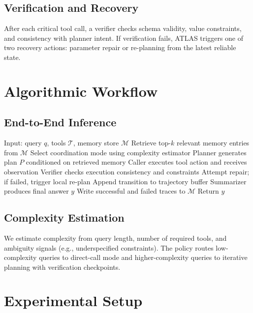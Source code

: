 \documentclass[conference]{IEEEtran}
\begin{document}
\subsection{Verification and Recovery}

After each critical tool call, a verifier checks schema validity, value constraints, and consistency with planner intent. If verification fails, ATLAS triggers one of two recovery actions: parameter repair or re-planning from the latest reliable state.

\section{Algorithmic Workflow}

\subsection{End-to-End Inference}

\begin{algorithmic}[1]
\STATE Input: query $q$, tools $\mathcal{T}$, memory store $\mathcal{M}$
\STATE Retrieve top-$k$ relevant memory entries from $\mathcal{M}$
\STATE Select coordination mode using complexity estimator
\STATE Planner generates plan $P$ conditioned on retrieved memory
    \STATE Caller executes tool action and receives observation
    \STATE Verifier checks execution consistency and constraints
        \STATE Attempt repair; if failed, trigger local re-plan
    \ENDIF
    \STATE Append transition to trajectory buffer
\ENDFOR
\STATE Summarizer produces final answer $y$
\STATE Write successful and failed traces to $\mathcal{M}$
\STATE Return $y$
\end{algorithmic}

\subsection{Complexity Estimation}

We estimate complexity from query length, number of required tools, and ambiguity signals (e.g., underspecified constraints). The policy routes low-complexity queries to direct-call mode and higher-complexity queries to iterative planning with verification checkpoints.

\section{Experimental Setup}
\end{document}
